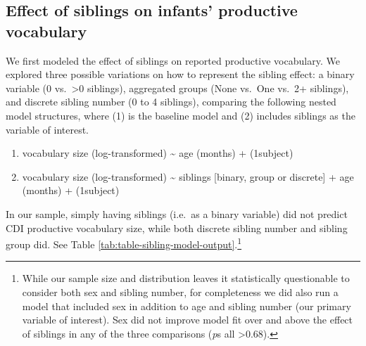 \documentclass[
  english,
  man,floatsintext]{apa6}
\providecommand{\tightlist}{%
  \setlength{\itemsep}{0pt}\setlength{\parskip}{0pt}}
\begin{document}
\hypertarget{effect-of-siblings-on-infants-productive-vocabulary}{%
\subsection{Effect of siblings on infants' productive vocabulary}\label{effect-of-siblings-on-infants-productive-vocabulary}}

We first modeled the effect of siblings on reported productive vocabulary. We explored three possible variations on how to represent the sibling effect: a binary variable (0 vs.~\textgreater0 siblings), aggregated groups (None vs.~One vs.~2+ siblings), and discrete sibling number (0 to 4 siblings), comparing the following nested model structures, where (1) is the baseline model and (2) includes siblings as the variable of interest.

\begin{enumerate}
\def\labelenumi{\arabic{enumi}.}
\tightlist
\item
  vocabulary size (log-transformed) \textasciitilde{} age (months) + (1\textbar subject)
\item
  vocabulary size (log-transformed) \textasciitilde{} siblings {[}binary, group or discrete{]} + age (months) + (1\textbar subject)
\end{enumerate}

In our sample, simply having siblings (i.e.~as a binary variable) did not predict CDI productive vocabulary size, while both discrete sibling number and sibling group did. See Table \ref{tab:table-sibling-model-output}.\footnote{While our sample size and distribution leaves it statistically questionable to consider both sex and sibling number, for completeness we did also run a model that included sex in addition to age and sibling number (our primary variable of interest). Sex did not improve model fit over and above the effect of siblings in any of the three comparisons (\emph{p}s all \textgreater0.68).}
\end{document}
